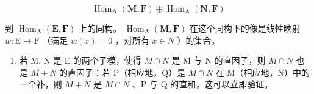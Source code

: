 \[
\operatorname{Hom} _ {\mathbf {A}} (\mathbf {M}, \mathbf {F}) \oplus \operatorname{Hom} _ {\mathbf {A}} (\mathbf {N}, \mathbf {F})
\]

到 \(\operatorname{Hom}_{\mathbf{A}}(\mathbf{E},\mathbf{F})\) 上的同构。 \(\operatorname{Hom}_{\mathbf{A}}(\mathbf{M},\mathbf{F})\) 在这个同构下的像是线性映射 \(w:\mathrm{E}\to \mathrm{F}\) （满足 \(w(x) = 0\) ，对所有 \(x\in N\) ）的集合。

\begin{enumerate}
\def\labelenumi{(\arabic{enumi})}
\setcounter{enumi}{1}
\tightlist
\item
  若 M, N 是 E 的两个子模，使得 \(M \cap N\) 是 M 与 N 的直因子，则 \(M \cap N\) 也是 \(M + N\) 的直因子：若 P（相应地，Q）是 \(M \cap N\) 在 M（相应地，N）中的一个补，则 \(M + N\) 是 \(M \cap N\) 、P 与 Q 的直和，这可以立即验证。
\end{enumerate}

